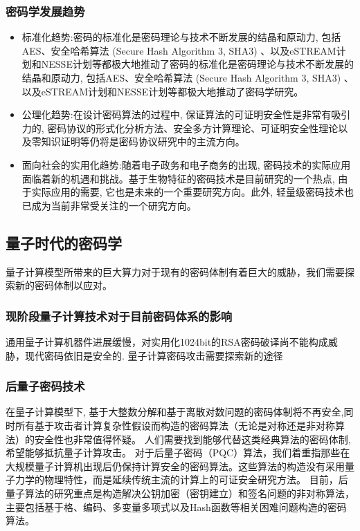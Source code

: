 \documentclass{article}
\begin{document}
\subsubsection{密码学发展趋势}
\begin{itemize}
    \item 标准化趋势:密码的标准化是密码理论与技术不断发展的结晶和原动力, 包括AES、安全哈希算法 (Secure Hash Algorithm 3, SHA3) 、以及eSTREAM计划和NESSE计划等都极大地推动了密码的标准化是密码理论与技术不断发展的结晶和原动力, 包括AES、安全哈希算法 (Secure Hash Algorithm 3, SHA3) 、以及eSTREAM计划和NESSE计划等都极大地推动了密码学研究。
    \item 公理化趋势:在设计密码算法的过程中, 保证算法的可证明安全性是非常有吸引力的, 密码协议的形式化分析方法、安全多方计算理论、可证明安全性理论以及零知识证明等仍将是密码协议研究中的主流方向。
    \item 面向社会的实用化趋势:随着电子政务和电子商务的出现, 密码技术的实际应用面临着新的机遇和挑战。基于生物特征的密码技术是目前研究的一个热点, 由于实际应用的需要, 它也是未来的一个重要研究方向。此外, 轻量级密码技术也已成为当前非常受关注的一个研究方向。
\end{itemize}
\subsection{量子时代的密码学}
量子计算模型所带来的巨大算力对于现有的密码体制有着巨大的威胁，我们需要探索新的密码体制以应对。
\subsubsection{现阶段量子计算技术对于目前密码体系的影响}
通用量子计算机器件进展缓慢，对实用化1024bit的RSA密码破译尚不能构成威胁，现代密码依旧是安全的. 量子计算密码攻击需要探索新的途径\citep{wangchao}
\subsubsection{后量子密码技术}
在量子计算模型下, 基于大整数分解和基于离散对数问题的密码体制将不再安全,同时所有基于攻击者计算复杂性假设而构造的密码算法（无论是对称还是非对称算法）的安全性也非常值得怀疑。 人们需要找到能够代替这类经典算法的密码体制, 希望能够抵抗量子计算攻击。
对于后量子密码（PQC）算法，我们着重指那些在大规模量子计算机出现后仍保持计算安全的密码算法。这些算法的构造没有采用量子力学的物理特性，而是延续传统主流的计算上的可证安全研究方法。
目前，后量子算法的研究重点是构造解决公钥加密（密钥建立）和签名问题的非对称算法，主要包括基于格、编码、多变量多项式以及Hash函数等相关困难问题构造的密码算法。\citep{liuhongwei}
\end{document}
